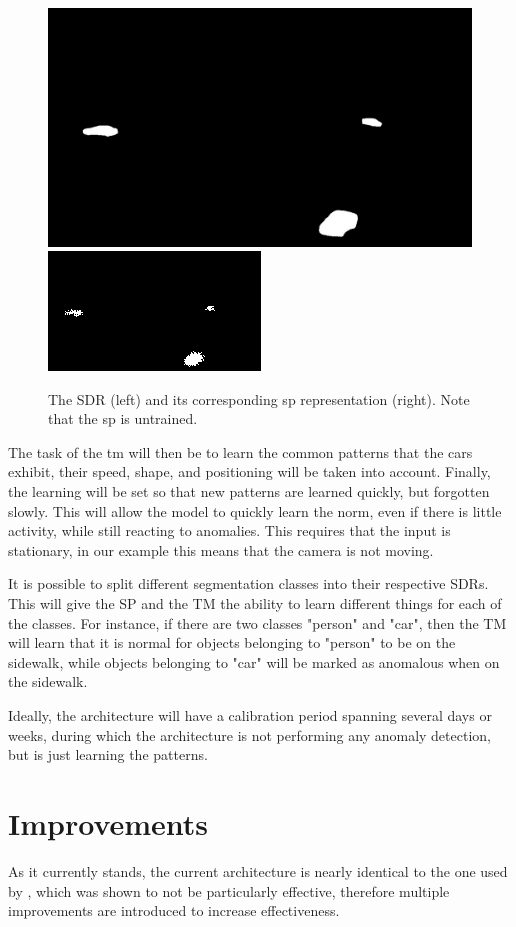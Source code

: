 \begin{figure}[H]
    \centering
    \includegraphics[width=.48\textwidth]{resources/methodology/car_segmentation.png}
    \includegraphics[width=.48\textwidth]{resources/methodology/car_segmentation_sp.png}
    \caption[SDR and SP Representation]{The SDR (left) and its corresponding \gls*{sp} representation (right). Note that the \gls*{sp} is untrained.}
    \label{fig:car_segmentation_sp}
\end{figure}
\par
The task of the \gls*{tm} will then be to learn the common patterns that the cars exhibit, their speed, shape, and positioning will be taken into account. Finally, the learning will be set so that new patterns are learned quickly, but forgotten slowly. This will allow the model to quickly learn the norm, even if there is little activity, while still reacting to anomalies. This requires that the input is stationary, in our example this means that the camera is not moving.
\par
It is possible to split different segmentation classes into their respective SDRs. This will give the SP and the TM the ability to learn different things for each of the classes. For instance, if there are two classes "person" and "car", then the TM will learn that it is normal for objects belonging to "person" to be on the sidewalk, while objects belonging to "car" will be marked as anomalous when on the sidewalk.
\par
Ideally, the architecture will have a calibration period spanning several days or weeks, during which the architecture is not performing any anomaly detection, but is just learning the patterns.
\section{Improvements}
As it currently stands, the current architecture is nearly identical to the one used by \textcite{MotionAnomalyDetection}, which was shown to not be particularly effective, therefore multiple improvements are introduced to increase effectiveness.

